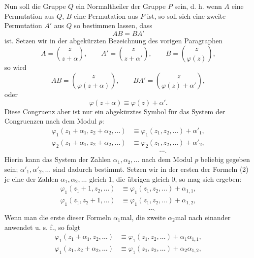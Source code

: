 \documentclass[11pt]{article}
\begin{document}
Nun soll die Gruppe $Q$ ein Normaltheiler der Gruppe $P$ sein, d. h. wenn $A$ eine Permutation aus $Q$, $B$ eine Permutation aus $P$ ist, so soll sich eine zweite Permutation $A'$ aus $Q$ so bestimmen lassen, dass
\begin{equation}
 AB=BA'
 \tag{1}
\end{equation}
ist. Setzen wir in der abgekürzten Bezeichnung des vorigen Paragraphen
\[
 A=\binom{z}{z+\alpha},\qquad
 A'=\binom{z}{z+\alpha'},\qquad
 B=\binom{z}{\varphi(z)},
\]
so wird
\[
 AB=\binom{z}{\varphi(z+\alpha)},\qquad
 BA'=\binom{z}{\varphi(z)+\alpha'},
\]
oder
\[
 \varphi(z+\alpha)\equiv \varphi(z)+\alpha' .
\]
Diese Congruenz aber ist nur ein abgekürztes Symbol für das System der Congruenzen nach dem Modul $p$:
\begin{equation}
\begin{aligned}
 \varphi_1(z_1+\alpha_1,z_2+\alpha_2,\ldots)&\equiv
        \varphi_1(z_1,z_2,\ldots)+\alpha'_1,\\
 \varphi_2(z_1+\alpha_1,z_2+\alpha_2,\ldots)&\equiv
        \varphi_2(z_1,z_2,\ldots)+\alpha'_2,\\
 &\hspace{4em}\cdots .
\end{aligned}
 \tag{2}
\end{equation}
Hierin kann das System der Zahlen $\alpha_1,\alpha_2,\ldots$ nach dem Modul $p$ beliebig gegeben sein; $\alpha'_1,\alpha'_2,\ldots$ sind dadurch bestimmt. Setzen wir in der ersten der Formeln (2) je eine der Zahlen $\alpha_1,\alpha_2,\ldots$ gleich $1$, die übrigen gleich $0$, so mag sich ergeben:
\begin{equation}
\begin{aligned}
 \varphi_1(z_1+1,z_2,\ldots)&\equiv\varphi_1(z_1,z_2,\ldots)+\alpha_{1,1},\\
 \varphi_1(z_1,z_2+1,\ldots)&\equiv\varphi_1(z_1,z_2,\ldots)+\alpha_{1,2},\\
 &\hspace{4em}\cdots .
\end{aligned}
 \tag{3}
\end{equation}
Wenn man die erste dieser Formeln $\alpha_1$mal, die zweite $\alpha_2$mal nach einander anwendet u. s. f., so folgt
\[
\begin{aligned}
 \varphi_1(z_1+\alpha_1,z_2,\ldots)&\equiv
 \varphi_1(z_1,z_2,\ldots)+\alpha_1\alpha_{1,1},\\
 \varphi_1(z_1,z_2+\alpha_2,\ldots)&\equiv
 \varphi_1(z_1,z_2,\ldots)+\alpha_2\alpha_{1,2},
\end{aligned}
\]
\end{document}
